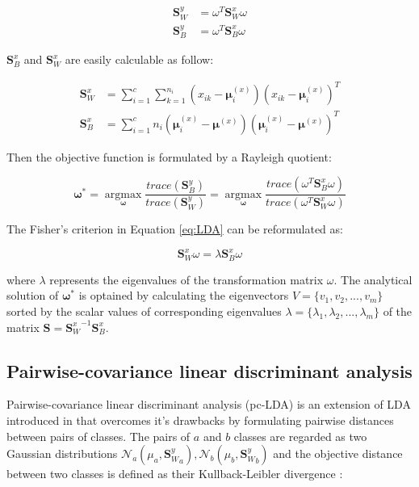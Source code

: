         \begin{align}
            \boldsymbol{S}_W^y &= \omega^T\boldsymbol{S}_W^x\omega\\
            \boldsymbol{S}_B^y &= \omega^T\boldsymbol{S}_B^x\omega
        \end{align}

        $\boldsymbol{S}_B^x$ and $\boldsymbol{S}_W^x$ are easily calculable as follow:

        \begin{align}
            \boldsymbol{S}_W^x &= \sum_{i=1}^{c}\sum_{k=1}^{n_{i}}(x_{ik}-\boldsymbol{\mu}_i^{(x)})(x_{ik}-\boldsymbol{\mu}_i^{(x)})^T \label{eq:LDA_Sw_x}\\
            \boldsymbol{S}_B^x &= \sum_{i=1}^{c}n_i(\boldsymbol{\mu}_i^{(x)} - \boldsymbol{\mu}^{(x)})(\boldsymbol{\mu}_i^{(x)} - \boldsymbol{\mu}^{(x)})^T \label{eq:LDA_Sb_x}
        \end{align}

        Then the objective function is formulated by a Rayleigh quotient:

        \begin{equation}
            \boldsymbol{\omega}^* = \operatorname*{argmax}_{\boldsymbol{\omega}}\frac{trace(\boldsymbol{S}_B^y)}{trace(\boldsymbol{S}_W^y)} = \operatorname*{argmax}_{\boldsymbol{\omega}}\frac{trace(\omega^T\boldsymbol{S}_B^x\omega)}{trace(\omega^T\boldsymbol{S}_W^x\omega)}
            \label{eq:LDA}
        \end{equation}

        The Fisher's criterion in Equation \eqref{eq:LDA} can be reformulated as:

        \begin{equation}
            \boldsymbol{S}_W^x\omega = \lambda\boldsymbol{S}_B^x\omega
        \end{equation}

        where $\lambda$ represents the eigenvalues of the transformation matrix $\omega$. The analytical solution of $\boldsymbol{\omega}^*$ is optained by calculating the eigenvectors $V = \{v_1,v_2,...,v_m\}$ sorted by the scalar values of corresponding eigenvalues $\lambda = \{\lambda_1,\lambda_2,...,\lambda_m\}$ of the matrix $\boldsymbol{S} = {\boldsymbol{S}_W^x}^{-1}\boldsymbol{S}_B^x$.

    \subsection{Pairwise-covariance linear discriminant analysis}
        Pairwise-covariance linear discriminant analysis (pc-LDA) is an extension of LDA introduced in \cite{kong2014pairwise} that overcomes it's drawbacks by formulating pairwise distances between pairs of classes.
        The pairs of $a$ and $b$ classes are regarded as two Gaussian distributions $\mathcal{N}_a(\mu_a,{\boldsymbol{S}_W^y}_a), \mathcal{N}_b(\mu_b,{\boldsymbol{S}_W^y}_b)$ and the objective distance between two classes is defined as their Kullback-Leibler divergence \cite{kullback1951}:

